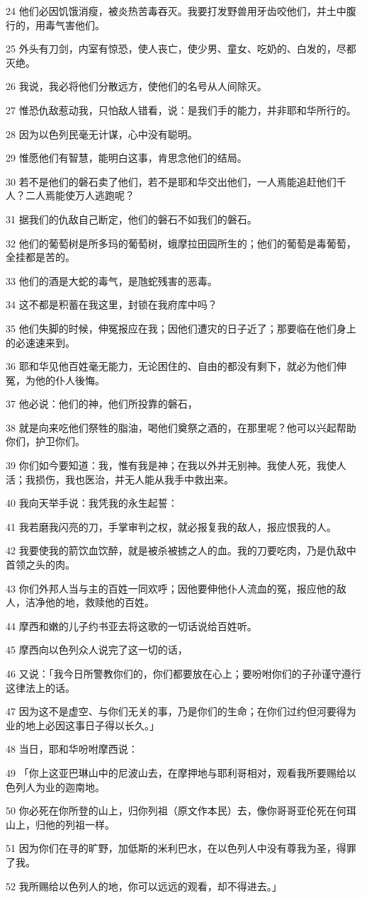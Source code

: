 \par 24 他们必因饥饿消瘦，被炎热苦毒吞灭。我要打发野兽用牙齿咬他们，并土中腹行的，用毒气害他们。
\par 25 外头有刀剑，内室有惊恐，使人丧亡，使少男、童女、吃奶的、白发的，尽都灭绝。
\par 26 我说，我必将他们分散远方，使他们的名号从人间除灭。
\par 27 惟恐仇敌惹动我，只怕敌人错看，说：是我们手的能力，并非耶和华所行的。
\par 28 因为以色列民毫无计谋，心中没有聪明。
\par 29 惟愿他们有智慧，能明白这事，肯思念他们的结局。
\par 30 若不是他们的磐石卖了他们，若不是耶和华交出他们，一人焉能追赶他们千人？二人焉能使万人逃跑呢？
\par 31 据我们的仇敌自己断定，他们的磐石不如我们的磐石。
\par 32 他们的葡萄树是所多玛的葡萄树，蛾摩拉田园所生的；他们的葡萄是毒葡萄，全挂都是苦的。
\par 33 他们的酒是大蛇的毒气，是虺蛇残害的恶毒。
\par 34 这不都是积蓄在我这里，封锁在我府库中吗？
\par 35 他们失脚的时候，伸冤报应在我；因他们遭灾的日子近了；那要临在他们身上的必速速来到。
\par 36 耶和华见他百姓毫无能力，无论困住的、自由的都没有剩下，就必为他们伸冤，为他的仆人後悔。
\par 37 他必说：他们的神，他们所投靠的磐石，
\par 38 就是向来吃他们祭牲的脂油，喝他们奠祭之酒的，在那里呢？他可以兴起帮助你们，护卫你们。
\par 39 你们如今要知道：我，惟有我是神；在我以外并无别神。我使人死，我使人活；我损伤，我也医治，并无人能从我手中救出来。
\par 40 我向天举手说：我凭我的永生起誓：
\par 41 我若磨我闪亮的刀，手掌审判之权，就必报复我的敌人，报应恨我的人。
\par 42 我要使我的箭饮血饮醉，就是被杀被掳之人的血。我的刀要吃肉，乃是仇敌中首领之头的肉。
\par 43 你们外邦人当与主的百姓一同欢呼；因他要伸他仆人流血的冤，报应他的敌人，洁净他的地，救赎他的百姓。
\par 44 摩西和嫩的儿子约书亚去将这歌的一切话说给百姓听。
\par 45 摩西向以色列众人说完了这一切的话，
\par 46 又说：「我今日所警教你们的，你们都要放在心上；要吩咐你们的子孙谨守遵行这律法上的话。
\par 47 因为这不是虚空、与你们无关的事，乃是你们的生命；在你们过约但河要得为业的地上必因这事日子得以长久。」
\par 48 当日，耶和华吩咐摩西说：
\par 49 「你上这亚巴琳山中的尼波山去，在摩押地与耶利哥相对，观看我所要赐给以色列人为业的迦南地。
\par 50 你必死在你所登的山上，归你列祖（原文作本民）去，像你哥哥亚伦死在何珥山上，归他的列祖一样。
\par 51 因为你们在寻的旷野，加低斯的米利巴水，在以色列人中没有尊我为圣，得罪了我。
\par 52 我所赐给以色列人的地，你可以远远的观看，却不得进去。」


